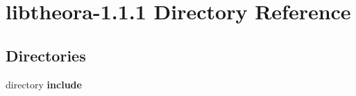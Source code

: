\section{libtheora-\/1.1.1 Directory Reference}
\label{dir_7b3bd63d69cbc3c1d3117d994bf2c129}
\subsection*{Directories}
\begin{DoxyCompactItemize}
\item 
directory \textbf{ include}
\end{DoxyCompactItemize}

